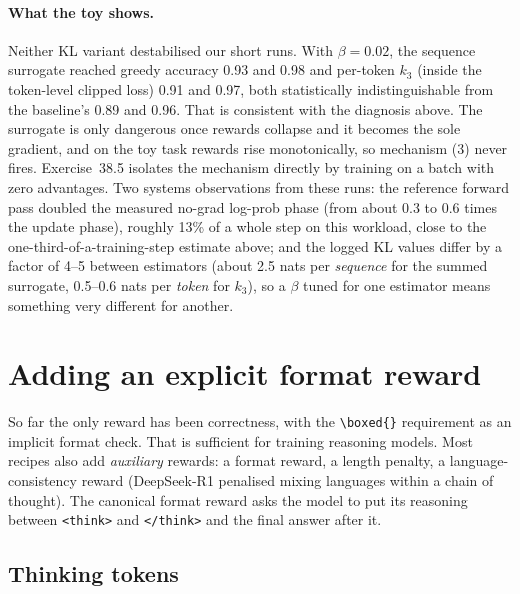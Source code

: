 \paragraph{What the toy shows.} Neither KL variant destabilised our short runs.
With $\beta=0.02$, the sequence surrogate reached greedy accuracy 0.93 and 0.98 and per-token
$k_3$ (inside the token-level clipped loss) 0.91 and 0.97, both statistically
indistinguishable from the baseline's 0.89 and 0.96. That is consistent with the diagnosis
above. The surrogate is only dangerous once rewards collapse and it becomes the sole
gradient, and on the toy task rewards rise monotonically, so mechanism (3) never fires.
Exercise~38.5 isolates the mechanism directly by training on a batch with zero advantages.
Two systems observations from these runs: the reference forward pass doubled the measured
no-grad log-prob phase (from about 0.3 to 0.6 times the update phase), roughly 13\% of a
whole step on this workload, close to the one-third-of-a-training-step estimate above; and the logged KL values differ by a factor of 4--5 between estimators
(about 2.5 nats per \emph{sequence} for the summed surrogate, 0.5--0.6 nats per \emph{token}
for $k_3$), so a $\beta$ tuned for one estimator means something very different for
another.


\section{Adding an explicit format reward}\label{sec:grpo2:format}

So far the only reward has been correctness, with the \verb|\boxed{}| requirement as an
implicit format check. That is sufficient for training reasoning models. Most recipes also add
\emph{auxiliary} rewards: a format reward, a length penalty, a language-consistency reward
(DeepSeek-R1 penalised mixing languages within a chain of thought). The canonical format
reward asks the model to put its reasoning between \verb|<think>| and \verb|</think>| and the
final answer after it.

\subsection{Thinking tokens}\label{sec:grpo2:think}

